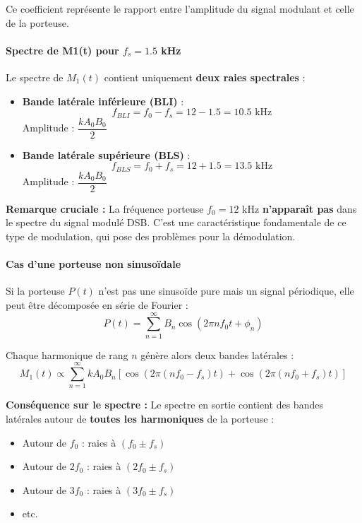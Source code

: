 \documentclass[11pt,a4paper]{article}
\begin{document}
Ce coefficient représente le rapport entre l'amplitude du signal modulant et celle de la porteuse.

\paragraph{Spectre de M1(t) pour $f_s = 1.5$ kHz}

Le spectre de $M_1(t)$ contient uniquement \textbf{deux raies spectrales} :

\begin{itemize}
    \item \textbf{Bande latérale inférieure (BLI)} : 
    \begin{equation}
    f_{BLI} = f_0 - f_s = 12 - 1.5 = 10.5 \text{ kHz}
    \end{equation}
    Amplitude : $\dfrac{k A_0 B_0}{2}$
    
    \item \textbf{Bande latérale supérieure (BLS)} : 
    \begin{equation}
    f_{BLS} = f_0 + f_s = 12 + 1.5 = 13.5 \text{ kHz}
    \end{equation}
    Amplitude : $\dfrac{k A_0 B_0}{2}$
\end{itemize}

\textbf{Remarque cruciale :} La fréquence porteuse $f_0 = 12$ kHz \textbf{n'apparaît pas} dans le spectre du signal modulé DSB. C'est une caractéristique fondamentale de ce type de modulation, qui pose des problèmes pour la démodulation.

\paragraph{Cas d'une porteuse non sinusoïdale}

Si la porteuse $P(t)$ n'est pas une sinusoïde pure mais un signal périodique, elle peut être décomposée en série de Fourier :
\begin{equation}
P(t) = \sum_{n=1}^{\infty} B_n \cos(2\pi n f_0 t + \phi_n)
\end{equation}

Chaque harmonique de rang $n$ génère alors deux bandes latérales :
\begin{equation}
M_1(t) \propto \sum_{n=1}^{\infty} k A_0 B_n [\cos(2\pi(n f_0 - f_s)t) + \cos(2\pi(n f_0 + f_s)t)]
\end{equation}

\textbf{Conséquence sur le spectre :} Le spectre en sortie contient des bandes latérales autour de \textbf{toutes les harmoniques} de la porteuse :
\begin{itemize}
    \item Autour de $f_0$ : raies à $(f_0 \pm f_s)$
    \item Autour de $2f_0$ : raies à $(2f_0 \pm f_s)$
    \item Autour de $3f_0$ : raies à $(3f_0 \pm f_s)$
    \item etc.
\end{itemize}
\end{document}
